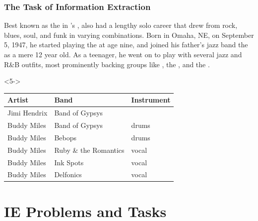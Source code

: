 \documentclass{beamer}
\begin{document}
\begin{frame}
    \frametitle{The Task of  Information Extraction}
    \begin{center}
        \begin{minipage}{.8\linewidth}
            \footnotesize Best known as the  in 's ,  also had a
            lengthy solo career that drew from rock, blues, soul, and funk in
            varying combinations. Born  in Omaha, NE, on
            September 5, 1947, he started playing the  at age nine,
            and joined his father's jazz band the  as a mere 12
            year old. As a teenager, he went on to play with several jazz and
            R\&B outfits, most prominently backing  groups like
            , the , and the
            .
        \end{minipage}
    \end{center}
    \begin{visibleenv}<5->
        \begin{center}
            \small
            \begin{tabular}{|l|l|l|}\hline
                \textbf{Artist} & \textbf{Band} & \textbf{Instrument}
                \\\hline\hline
                Jimi Hendrix & Band of Gypsys & \\
                Buddy Miles & Band of Gypsys & drums \\
                Buddy Miles & Bebops & drums \\
                Buddy Miles & Ruby \& the Romantics & vocal \\
                Buddy Miles & Ink Spots & vocal \\
                Buddy Miles & Delfonics & vocal \\\hline
            \end{tabular}
        \end{center}
    \end{visibleenv}
\end{frame}

\section{IE Problems and Tasks}
\end{document}
